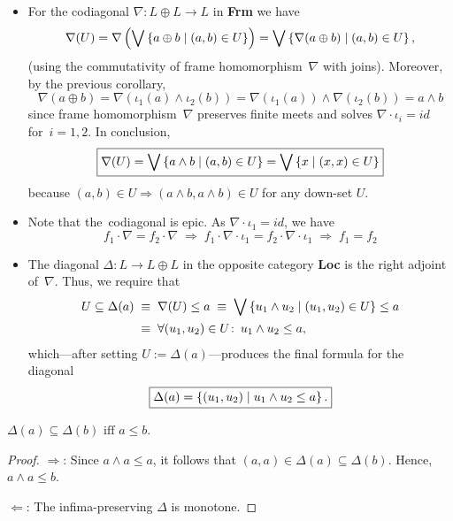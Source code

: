 \begin{itemize}
\item
{}
\label{codiag-in-Frm}
For the codiagonal $\nabla\colon L \oplus L \to L$ in {\bf Frm} we have
\[
  \nabla(U)
  = \nabla \left( \bigvee \left\{ a \oplus b \mid (a, b)\in U \right\} \right)
  = \bigvee \left\{ \nabla(a \oplus b) \mid (a, b)\in U \right\},
\]
(using the commutativity of frame homomorphism~$\nabla$ with joins).
Moreover, by the previous corollary,
\[
  \nabla(a \oplus b)
  = \nabla( \iota_1(a) \wedge \iota_2(b) )
  = \nabla(\iota_1(a)) \wedge \nabla(\iota_2(b))
  = a \wedge b
\]
since frame homomorphism~$\nabla$ preserves finite meets and solves
$\nabla\cdot \iota_i = id$ for~$i = 1, 2$.
In conclusion,
\[
  \boxed{
    \nabla(U)
    = \bigvee \left\{ a \wedge b \mid (a, b)\in U \right\}
    = \bigvee \left\{ x \mid (x, x)\in U \right\}
  }
\]
because $(a, b)\in U \Rightarrow (a \wedge b, a \wedge b)\in U$ for any
down-set $U$.

\item Note that the~codiagonal is epic.
As $\nabla \cdot \iota_1 = id$, we have
\[
  f_1 \cdot \nabla = f_2 \cdot \nabla
  \; \Longrightarrow \;
  f_1 \cdot \nabla \cdot \iota_1 = f_2 \cdot \nabla \cdot \iota_1
  \; \Longrightarrow \;
  f_1 = f_2
\]

\item The diagonal $\Delta\colon L \to L \oplus L$ in the opposite category
{\bf Loc} is the right adjoint of~$\nabla$.
Thus, we require that
\begin{align*}
  U\subseteq \Delta(a)
  \; &\equiv \; \nabla(U) \le a
  \; \equiv \; \bigvee \left\{ u_1 \wedge u_2 \mid (u_1, u_2)\in U \right\} \le
  a \\
  \; &\equiv \; \forall (u_1, u_2)\in U\colon \, u_1 \wedge u_2 \le a,
\end{align*}
which---after setting $U := \Delta(a)$---produces the final formula for the
diagonal
\[
  \boxed{
    \Delta(a) = \left\{ (u_1, u_2) \mid u_1 \wedge u_2 \le a \right\}.
  }
\]
\end{itemize}

\begin{lem} \label{lem:delta-monotone}
  $\Delta(a) \subseteq \Delta(b) \text{ iff } a \le b$.
\end{lem}
\begin{proof}
  $\Rightarrow$:
  Since $a \wedge a \le a$, it follows that $(a, a)\in \Delta(a) \subseteq
  \Delta(b)$.
  Hence, $a \wedge a \le b$.

  $\Leftarrow$:
  The infima-preserving $\Delta$ is monotone.
\end{proof}

